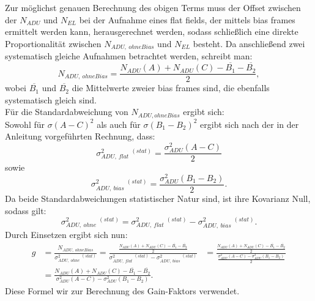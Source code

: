 Zur möglichst genauen Berechnung des obigen Terms muss der Offset zwischen der $N_{ADU}$ und $N_{EL}$ bei der Aufnahme eines flat fields, der mittels bias frames ermittelt werden kann, herausgerechnet werden, sodass schließlich eine direkte Proportionalität zwischen $N_{ADU,\ ohneBias}$ und $N_{EL}$ besteht. 
Da anschließend zwei systematisch gleiche Aufnahmen betrachtet werden, schreibt man: 
\begin{equation}
N_{ADU,\ ohneBias} = \frac{N_{ADU}(A) + N_{ADU}(C) - \overline{B_1} - \overline{B_2}}{2}, 
\end{equation}
wobei $\overline{B_1}$ und $\overline{B_2}$ die Mittelwerte zweier bias frames sind, die ebenfalls systematisch gleich sind. \\
Für die Standardabweichung von $N_{ADU, ohneBias}$ ergibt sich: \\
Sowohl für $\sigma(A-C)^2$ als auch für $\sigma(B_1 - B_2)^2$ ergibt sich nach der in der Anleitung vorgeführten Rechnung, dass:
\begin{equation}
\sigma_{ADU,\ flat}^2 \ ^{(stat)} = \frac{\sigma_{ADU}^2(A-C)}{2}
\end{equation}
sowie
\begin{equation}
\sigma_{ADU,\ bias}^2 \ ^{(stat)} = \frac{\sigma_{ADU}^2(B_1-B_2)}{2}.
\end{equation}
Da beide Standardabweichungen statistischer Natur sind, ist ihre Kovarianz Null, sodass gilt: 
\begin{equation}
\sigma_{ADU, \ ohne}^2  \ ^{(stat)}=  \sigma_{ADU,\ flat}^2 \ ^{(stat)} - \sigma_{ADU,\ bias}^2 \ ^{(stat)}.
\end{equation}
Durch Einsetzen ergibt sich nun: 
\begin{align}
g &= \frac{N_{ADU,\ ohneBias}}{\sigma_{ADU, \ ohne}^2  \ ^{(stat)}} = \frac{\frac{N_{ADU}(A) + N_{ADU}(C) - \overline{B_1} - \overline{B_2}}{2}}{\sigma_{ADU,\ flat}^2 \ ^{(stat)} - \sigma_{ADU,\ bias}^2 \ ^{(stat)}} &=\frac{\frac{N_{ADU}(A) + N_{ADU}(C) - \overline{B_1} - \overline{B_2}}{2}}{\frac{\sigma_{ADU}^2(A-C) - \sigma_{ADU}^2(B_1-B_2)}{2}} \nonumber\\
&= \frac{N_{ADU}(A) + N_{ADU}(C) - \overline{B_1} - \overline{B_2}}{\sigma_{ADU}^2(A-C) - \sigma_{ADU}^2(B_1-B_2)}.\
\label{form:gain}
\end{align}
Diese Formel wir zur Berechnung des Gain-Faktors verwendet. 

